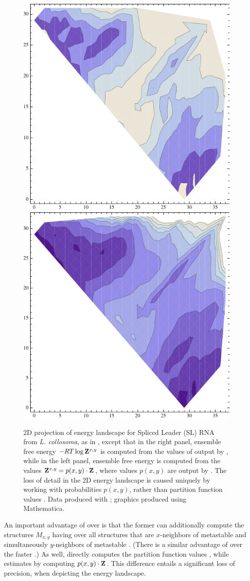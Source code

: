\begin{figure}[!ht]
\centering
\includegraphics[width=.45\textwidth]{Figures/FFTbor2D/rtwofoldProbContour.pdf}
\quad
\includegraphics[width=.45\textwidth]{Figures/FFTbor2D/rtwofoldEnsFreeEnergyContour.pdf}
\caption[2D projection of energy landscape for Spliced Leader (SL) RNA
from {\em L. collosoma}, as in
,
except that in the right panel, ensemble free energy $-RT \log \bfZ{x,y}{}$
is computed from the values of  output by \rnatwofold,
while in the left panel, ensemble free energy is computed from
the values $\bfZ{x,y}{}=p(x,y) \cdot \fullZ$, where values $p(x,y)$ are output
by \rnatwofold]{
2D projection of energy landscape for Spliced Leader (SL) RNA
from {\em L. collosoma}, as in
,
except that in the right panel, ensemble free energy $-RT \log \bfZ{x,y}{}$
is computed from the values of  output by \rnatwofold,
while in the left panel, ensemble free energy is computed from
the values $\bfZ{x,y}{}=p(x,y) \cdot \fullZ$, where values $p(x,y)$ are output
by \rnatwofold.
The loss of detail in the 2D energy landscape is caused uniquely by
working with probabilities $p(x,y)$, rather than partition function
values .
Data produced with \rnatwofold; graphics produced using Mathematica.
}
\label{fig:ffttwo:rtwofoldProbContour}
\end{figure}

An important advantage of
\rnatwofold over \ffttwo is that the former can additionally
compute the structures $M_{x,y}$ having \mfe over all
structures that are $x$-neighbors of metastable \strA and simultaneously
$y$-neighbors of metastable \strB. (There is a similar advantage of \rnabor
\citep{freyhult.b07} over the faster \fftbor \citep{senter.po12}.)
As well, \rnatwofold directly computes the partition function values
, while \ffttwo estimates  by computing
$p(x,y) \cdot {\bf Z}^{}_{}$. This difference entails a significant loss of precision,
when depicting the energy landscape.

